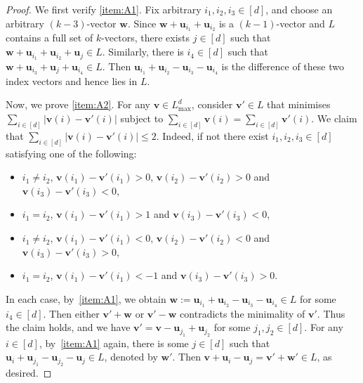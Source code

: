 \documentclass[11pt, letterpaper]{amsart}
\theoremstyle{plain}
\numberwithin{equation}{section}
\theoremstyle{definition}
\renewcommand{\vec}[1]{{\mathbf #1}}
\begin{document}
    \begin{proof}
        We first verify \ref{item:A1}. Fix arbitrary \(i_1, i_2, i_3\in [d]\), and choose an arbitrary \((k-3)\)-vector \(\vec{w}\). Since \(\vec{w}+\vec{u}_{i_1}+\vec{u}_{i_2}\) is a \((k-1)\)-vector and \(L\) contains a full set of \(k\)-vectors, there exists \(j\in [d]\) such that \(\vec{w}+\vec{u}_{i_1}+\vec{u}_{i_2}+\vec{u}_{j}\in L\). 
        Similarly, there is \(i_4\in[d]\) such that \(\vec{w}+\vec{u}_{i_3}+\vec{u}_{j}+\vec{u}_{i_4}\in L\). 
        Then  \(\vec{u}_{i_1}+\vec{u}_{i_2}-\vec{u}_{i_3}-\vec{u}_{i_4}\) is the difference of these two index vectors and hence lies in \(L\). 
        
        Now, we prove \ref{item:A2}. For any \(\vec{v}\in L_{\max}^{d}\), consider \(\vec{v'}\in L\) that minimises \(\sum_{i\in[d]}\left|{\vec{v}}(i)-{\vec{v'}}(i)\right|\) subject to \(\sum_{i\in [d]}{\vec{v}}(i)=\sum_{i\in [d]}{\vec{v'}}(i)\). We claim that  \(\sum_{i\in[d]}\left|{\vec{v}}(i)-{\vec{v'}}(i)\right|\le 2\). Indeed, if not there exist \(i_1,i_2,i_3\in [d]\) satisfying one of the following:
        \begin{itemize}
            \item \(i_1\neq i_2\), \({\vec{v}}(i_1)-{\vec{v'}}(i_1)>0\), \({\vec{v}}(i_2)-{\vec{v'}}(i_2)>0\) and \({\vec{v}}(i_3)-{\vec{v'}}(i_3)<0\),
            \item \(i_1=i_2\), \({\vec{v}}(i_1)-{\vec{v'}}(i_1)>1\) and \({\vec{v}}(i_3)-{\vec{v'}}(i_3)<0\),
            \item \(i_1\neq i_2\), \({\vec{v}}(i_1)-{\vec{v'}}(i_1)<0\), \({\vec{v}}(i_2)-{\vec{v'}}(i_2)<0\) and \({\vec{v}}(i_3)-{\vec{v'}}(i_3)>0\),
            \item \(i_1=i_2\), \({\vec{v}}(i_1)-{\vec{v'}}(i_1)<-1\) and \({\vec{v}}(i_3)-{\vec{v'}}(i_3)>0\). 
        \end{itemize}
        In each case, by~\ref{item:A1}, we obtain \(\vec{w}:=\vec{u}_{i_1}+\vec{u}_{i_2}-\vec{u}_{i_3}-\vec{u}_{i_4}\in L\) for some \(i_4\in [d]\). Then either \(\vec{v'}+\vec{w}\) or \(\vec{v'}-\vec{w}\) contradicts the minimality of \(\vec{v'}\). 
        Thus the claim holds, and we have \(\vec{v'}=\vec{v}-\vec{u}_{j_1}+\vec{u}_{j_2}\) for some \(j_1,j_2\in [d]\). For any \(i\in [d]\), by~\ref{item:A1} again, there is some \(j\in [d]\) such that \(\vec{u}_i+\vec{u}_{j_1}-\vec{u}_{j_2}-\vec{u}_{j}\in L\), denoted by \(\vec{w'}\). Then \(\vec{v}+\vec{u}_{i}-\vec{u}_{j}=\vec{v'}+\vec{w'}\in L\), as desired.
    \end{proof}
\end{document}
